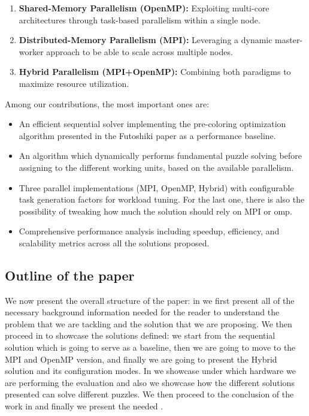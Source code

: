 \begin{enumerate}
    \item \textbf{Shared-Memory Parallelism (OpenMP):} \cite{OpenMP2020} Exploiting multi-core architectures through task-based parallelism within a single node.
    \item \textbf{Distributed-Memory Parallelism (MPI):} \cite{MPIForum2021} Leveraging a dynamic master-worker approach to be able to scale across multiple nodes.
    \item \textbf{Hybrid Parallelism (MPI+OpenMP):} Combining both paradigms to maximize resource utilization.
\end{enumerate}

Among our contributions, the most important ones are:
\begin{itemize}
    \item An efficient sequential solver implementing the pre-coloring optimization algorithm presented in the Futoshiki paper as a performance baseline.
    \item An algorithm which dynamically performs fundamental puzzle solving before assigning to the different working units, based on the available parallelism. 
    \item Three parallel implementations (MPI, OpenMP, Hybrid) with configurable task generation factors for workload tuning. For the last one, there is also the possibility of tweaking how much the solution should rely on MPI or omp.
    \item Comprehensive performance analysis including speedup, efficiency, and scalability metrics across all the solutions proposed.
\end{itemize}


\subsection{Outline of the paper}
We now present the overall structure of the paper: in  we first present all of the necessary background information needed for the reader to understand the problem that we are tackling and the solution that we are proposing. We then proceed in  to showcase the solutions defined: we start from the sequential solution which is going to serve as a baseline, then we are going to move to the MPI and OpenMP version, and finally we are going to present the Hybrid solution and its configuration modes. In  we showcase under which hardware we are performing the evaluation and also we showcase how the different solutions presented can solve different puzzles. We then proceed to the conclusion of the work in  and finally we present the needed .